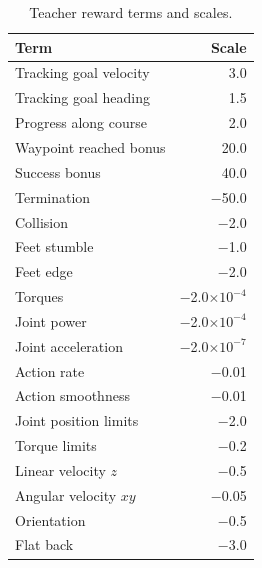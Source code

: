 \begin{table}[h]
	\centering
	\caption{Teacher reward terms and scales.}
	\label{tab:reward}
	\small
	\begin{tabular}{@{}lr@{}}
		\toprule
		Term                   & Scale                  \\
		\midrule
		Tracking goal velocity & 3.0                    \\
		Tracking goal heading  & 1.5                    \\
		Progress along course  & 2.0                    \\
		Waypoint reached bonus & 20.0                   \\
		Success bonus          & 40.0                   \\
		\midrule
		Termination            & $-$50.0                \\
		Collision              & $-$2.0                 \\
		Feet stumble           & $-$1.0                 \\
		Feet edge              & $-$2.0                 \\
		\midrule
		Torques                & $-$2.0$\times 10^{-4}$ \\
		Joint power            & $-$2.0$\times 10^{-4}$ \\
		Joint acceleration     & $-$2.0$\times 10^{-7}$ \\
		Action rate            & $-$0.01                \\
		Action smoothness      & $-$0.01                \\
		Joint position limits  & $-$2.0                 \\
		Torque limits          & $-$0.2                 \\
		\midrule
		Linear velocity $z$    & $-$0.5                 \\
		Angular velocity $xy$  & $-$0.05                \\
		Orientation            & $-$0.5                 \\
		Flat back              & $-$3.0                 \\
		\bottomrule
	\end{tabular}
\end{table}
